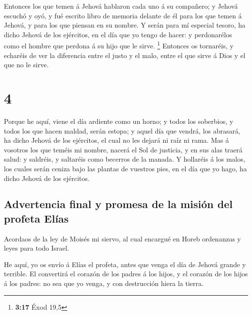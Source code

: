  Entonces los que temen á Jehová hablaron cada uno á su
compañero; y Jehová escuchó y oyó, y fué escrito libro de memoria
delante de él para los que temen á Jehová, y para los que piensan en su
nombre.  Y serán para mí especial tesoro, ha dicho Jehová
de los ejércitos, en el día que yo tengo de hacer: y perdonarélos como
el hombre que perdona á su hijo que le sirve. \footnote{\textbf{3:17}
  Éxod 19,5}  Entonces os tornaréis, y echaréis de ver la
diferencia entre el justo y el malo, entre el que sirve á Dios y el que
no le sirve.

\hypertarget{section-3}{%
\section{4}\label{section-3}}

 Porque he aquí, viene el día ardiente como un horno; y
todos los soberbios, y todos los que hacen maldad, serán estopa; y aquel
día que vendrá, los abrasará, ha dicho Jehová de los ejércitos, el cual
no les dejará ni raíz ni rama.  Mas á vosotros los que
teméis mi nombre, nacerá el Sol de justicia, y en sus alas traerá salud:
y saldréis, y saltaréis como becerros de la manada.  Y
hollaréis á los malos, los cuales serán ceniza bajo las plantas de
vuestros pies, en el día que yo hago, ha dicho Jehová de los ejércitos.

\hypertarget{advertencia-final-y-promesa-de-la-misiuxf3n-del-profeta-eluxedas}{%
\subsection{Advertencia final y promesa de la misión del profeta
Elías}\label{advertencia-final-y-promesa-de-la-misiuxf3n-del-profeta-eluxedas}}

 Acordaos de la ley de Moisés mi siervo, al cual encargué en
Horeb ordenanzas y leyes para todo Israel.

 He aquí, yo os envío á Elías el profeta, antes que venga el
día de Jehová grande y terrible.  El convertirá el corazón
de los padres á los hijos, y el corazón de los hijos á los padres: no
sea que yo venga, y con destrucción hiera la tierra.
